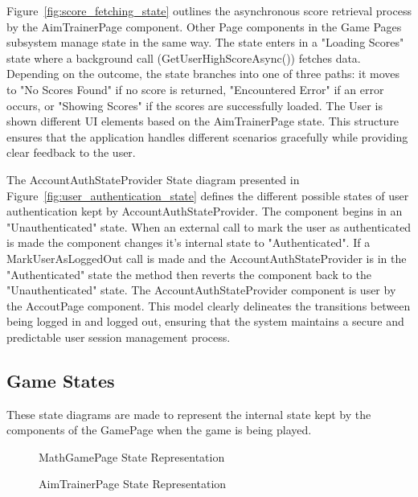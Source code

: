 \documentclass[11pt,a4paper]{article}
\newcommand{\inputdiagram}[1]{}
\newcommand{\textwidthdiagram}[2][1]{%
  \resizebox{#1\textwidth}{!}{\inputdiagram{#2}}%
}
\begin{document}
Figure~\ref{fig:score_fetching_state} outlines the asynchronous score
retrieval process by the AimTrainerPage component. Other Page components in
the Game Pages subsystem manage state in the same way. The state enters in
a "Loading Scores" state where a background call (GetUserHighScoreAsync())
fetches data. Depending on the outcome, the state branches into one of three
paths: it moves to "No Scores Found" if no score is returned, "Encountered
Error" if an error occurs, or "Showing Scores" if the scores are successfully
loaded. The User is shown different UI elements based on the AimTrainerPage
state. This structure ensures that the application handles different scenarios
gracefully while providing clear feedback to the user.

The AccountAuthStateProvider State diagram presented in
Figure~\ref{fig:user_authentication_state} defines the different possible
states of user authentication kept by AccountAuthStateProvider. The
component begins in an "Unauthenticated" state. When an external call
to mark the user as authenticated is made the component changes it's
internal state to "Authenticated". If a MarkUserAsLoggedOut call is made
and the AccountAuthStateProvider is in the "Authenticated" state the
method then reverts the component back to the "Unauthenticated" state. The
AccountAuthStateProvider component is user by the AccoutPage component. This
model clearly delineates the transitions between being logged in and logged
out, ensuring that the system maintains a secure and predictable user session
management process.

\subsection{Game States}

These state diagrams are made to represent the internal state kept by
the components of the GamePage when the game is being played.

\begin{figure}[H]
    \centering
    \begin{minipage}[b]{0.48\textwidth}
        \centering
        \textwidthdiagram{math_state.tex}
        \caption{MathGamePage State Representation}
        \label{fig:math_state}
    \end{minipage}
    \hfil
    \begin{minipage}[b]{0.48\textwidth}
        \centering
        \textwidthdiagram{aim_trainer_state.tex}
        \caption{AimTrainerPage State Representation}
        \label{fig:aim_trainer_state}
    \end{minipage}
\end{figure}
\end{document}
